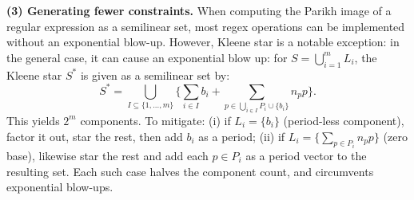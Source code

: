 
\medskip
\noindent
\textbf{(3) Generating fewer constraints.}  
When computing the Parikh image of a regular expression as a semilinear set,
	most regex operations can be implemented without an exponential blow-up.
	However, Kleene star is a notable exception: in the general case, it can cause an exponential blow up: for $S=\bigcup_{i=1}^m L_i$,  the Kleene star $S^\ast$ is given as a semilinear set by: 
	\[
	S^\ast=\bigcup_{I \subseteq \{1,...,m\}} 
	\Big\{\sum_{i \in I} b_i + \sum_{p \in \bigcup_{i \in I} P_i\cup \{b_i\}} n_p p\Big\}.
	\]
	This yields $2^m$ components. To mitigate:
	(i) if $L_i=\{b_i\}$ (period-less component), factor it out, star the rest, then add $b_i$ as a period;  
	(ii) if $L_i=\{\sum_{p\in P_i}n_pp\}$ (zero base), likewise star the rest and add each $p\in P_i$ as a period vector to the resulting set.  
	Each such case halves the component count, and circumvents exponential blow-ups.





